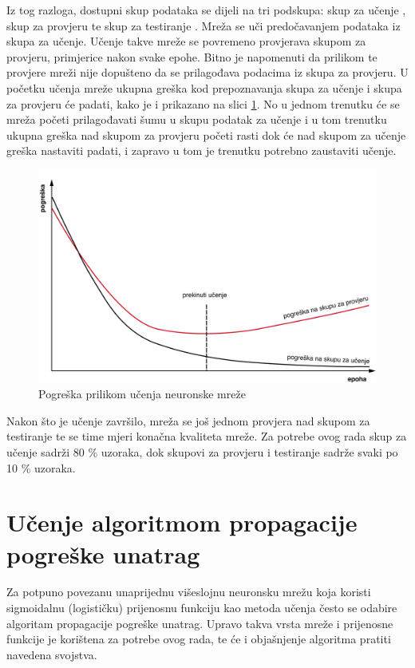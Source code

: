 Iz tog razloga, dostupni skup podataka se dijeli na tri podskupa: skup za učenje , skup za provjeru  te skup za testiranje . Mreža se uči predočavanjem podataka iz skupa za učenje. Učenje takve mreže se povremeno provjerava skupom za provjeru, primjerice nakon svake epohe. Bitno je napomenuti da prilikom te provjere mreži nije dopušteno da se prilagođava podacima iz skupa za provjeru. U početku učenja mreže ukupna greška kod prepoznavanja skupa za učenje i skupa za provjeru će padati, kako je i prikazano na slici \ref{fig:learning_curve}. No u jednom trenutku će se mreža početi prilagođavati šumu u skupu podatak za učenje i u tom trenutku ukupna greška nad skupom za provjeru početi rasti dok će nad skupom za učenje greška nastaviti padati, i zapravo u tom je trenutku potrebno zaustaviti učenje.
\begin{figure}[htb]
    \centering
    \includegraphics[width=14cm]{images/learning_curve.pdf}
    \caption{Pogreška prilikom učenja neuronske mreže}
    \label{fig:learning_curve}
\end{figure}

Nakon što je učenje završilo, mreža se još jednom provjera nad skupom za testiranje te se time mjeri konačna kvaliteta mreže. Za potrebe ovog rada skup za učenje sadrži 80 \% uzoraka, dok skupovi za provjeru i testiranje sadrže svaki po 10 \% uzoraka.

\section{Učenje algoritmom propagacije pogreške unatrag}

Za potpuno povezanu unaprijednu višeslojnu neuronsku mrežu koja koristi sigmoidalnu (logističku) prijenosnu funkciju kao metoda učenja često se odabire algoritam propagacije pogreške unatrag. Upravo takva vrsta mreže i prijenosne funkcije je korištena za potrebe ovog rada, te će i objašnjenje algoritma pratiti navedena svojstva.

